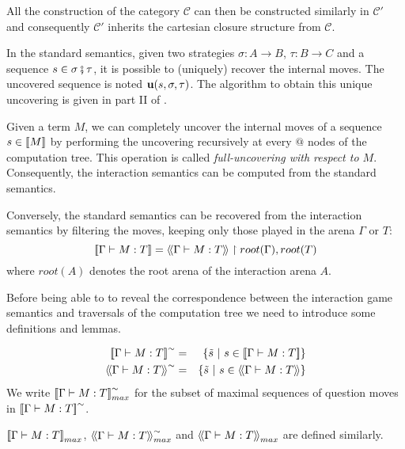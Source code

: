 All the construction of the category $\mathcal{C}$ can then be constructed similarly in $\mathcal{C'}$ and consequently
$\mathcal{C'}$ inherits the cartesian closure structure from $\mathcal{C}$.


In the standard semantics, given two strategies $\sigma : A \rightarrow B$, $\tau : B \rightarrow C$ and
a sequence $s \in \sigma \fatsemi \tau$, it is possible to (uniquely) recover the internal moves. The uncovered sequence is noted
 ${\bf u}(s, \sigma, \tau)$. The algorithm to obtain this unique uncovering is given in part II of \cite{hylandong_pcf}.

Given a term $M$, we can completely uncover the internal moves of a sequence $s\in{[\![M ]\!]}$
by performing the uncovering recursively at every $@$ nodes of the computation tree.
This operation is called \emph{full-uncovering with respect to $M$}.
Consequently, the interaction semantics can be computed from the standard semantics.


Conversely, the standard semantics can be recovered from the interaction semantics by filtering the moves, keeping only those played
in the arena $\Gamma$ or $T$:
$$ {[\![ \Gamma \vdash M : T ]\!]} = {\langle\!\langle \Gamma \vdash M : T \rangle\!\rangle} \upharpoonright root(\Gamma), root(T)$$
where $root(A)$ denotes the root arena of the interaction arena $A$.



Before being able to to reveal the correspondence between the interaction game
semantics and traversals of the computation tree we need to introduce some definitions
and lemmas.

\begin{dfn}
\begin{eqnarray*}
\sem{\Gamma\vdash M:T}^{\sim} &=& \{ \tilde{s} \ | \ s \in \sem{\Gamma\vdash M:T} \} \\
\intersem{\Gamma\vdash M:T}^{\sim} &=& \{ \tilde{s} \ | \ s \in \intersem{\Gamma\vdash M:T} \}
\end{eqnarray*}
We write ${[\![ \Gamma\vdash M:T ]\!]}^{\sim}_{max}$ for the subset of maximal sequences of question moves in
${[\![ \Gamma\vdash M:T ]\!]}^{\sim}$.

${[\![ \Gamma\vdash M:T ]\!]}_{max}$, ${\langle\!\langle \Gamma\vdash M:T \rangle\!\rangle}^{\sim}_{max}$ and
${\langle\!\langle \Gamma\vdash M:T \rangle\!\rangle}_{max}$ are defined similarly.
\end{dfn}

